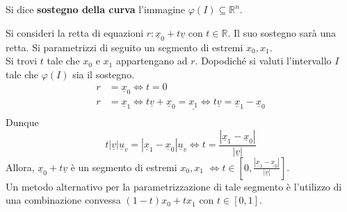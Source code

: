 \begin{definition}
    Si dice \textbf{sostegno della curva} l'immagine $\varphi(I) \subseteq \mathbb{R}^n$.
\end{definition}
\begin{example}
   Si consideri la retta di equazioni $r:\underline{x}_0+t\underline{v}$ con $t \in \mathbb{R}$. Il suo sostegno sarà una retta. Si parametrizzi di seguito un segmento di estremi $x_0, x_1$.\\
   Si trovi $t$ tale che $x_0$ e $x_1$ appartengano ad $r$. Dopodiché si valuti l'intervallo $I$ tale che $\varphi(I)$ sia il sostegno.
   \begin{equation*}
    \begin{aligned}  
        r&=\underline{x}_0 \iff t=0\\
        r&=\underline{x}_1 \iff t\underline{v}+\underline{x}_0=\underline{x_1}\iff t\underline{v}=\underline{x}_1-\underline{x}_0\\
        \end{aligned}
    \end{equation*}
    Dunque
    \begin{equation*}
 t|\underline{v}|\underline{u}_v=|\underline{x}_1-\underline{x}_0|\underline{u}_v \iff t=\frac{|\underline{x}_1-\underline{x}_0|}{|\underline{v}|}
    \end{equation*}
    Allora, $\underline{x}_0 + t\underline{v}$ è un segmento di estremi $x_0, x_1$ $\iff t \in \left[0, \frac{|\underline{x}_1-\underline{x}_0|}{|\underline{v}|}\right]$.\\ 
   Un metodo alternativo per la parametrizzazione di tale segmento è l'utilizzo di una combinazione convessa $(1-t) x_0 + tx_1$ con $t \in [0,1]$.
\end{example}
